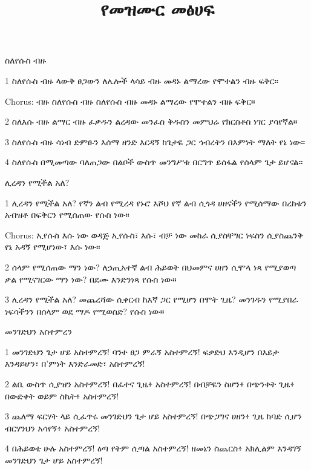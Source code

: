 \documentclass[12pt]{article}
\title{የመዝሙር መፅሀፍ}
\author{}
\date{}
\begin{document}
\maketitle
\newpage

\begin{hymn}{1}{ስለየሱስ ብዙ}
\begin{stanza}
1 ስለየሱስ ብዙ ላውቅ
ፀጋውን ለሌሎች ላሳይ
ብዙ መዳኑ ልማረው
የሞተልን ብዙ ፍቅር።
\end{stanza}
\begin{chorus}
Chorus: ብዙ ስለየሱስ
ብዙ ስለየሱስ
ብዙ መዳኑ ልማረው
የሞተልን ብዙ ፍቅር።
\end{chorus}
\begin{stanza}
2 ስለእሱ ብዙ ልማር
ብዙ ፈቃዱን ልረዳው
መንፈስ ቅዱስን መምህሬ
የክርስቶስ ነገር ያሳየኛል።
\end{stanza}
\begin{stanza}
3 ስለየሱስ ብዙ ሳነብ
ድምፁን እሰማ ዘንድ እርዳኝ
ከጌታዬ ጋር ኅብረትን
በእምነት ማለት የኔ ነው።
\end{stanza}
\begin{stanza}
4 ስለየሱስ በሚመጣው
ባለጠጋው በልቦች ውስጥ
መንግሥቱ በርግጥ ይሰፋል
የሰላም ጌታ ይሆናል።
\end{stanza}
\end{hymn}

\begin{hymn}{2}{ሊረዳን የሚችል አለ?}
\begin{stanza}
1 ሊረዳን የሚችል አለ?
የኛን ልብ የሚረዳ
የኑሮ እሾህ
የኛ ልብ ሲጎዳ
ሀዘናችን የሚሰማው
በረከቱን አብዝቶ
በፍቅርን የሚሰጠው
የሱስ ነው።
\end{stanza}
\begin{chorus}
Chorus: ኢየሱስ እሱ ነው
ወዳጅ ኢየሱስ፣ እሱ፣ ብቻ ነው
መከራ ሲያስቸግር
ነፍስን ሲያስጨንቅ
የኔ አዳኝ የሚሆነው፣ እሱ ነው።
\end{chorus}
\begin{stanza}
2 ሰላም የሚሰጠው ማን ነው?
ለኃጢአተኛ ልብ
ሕይወት በህመምና 
ሀዘን ሲሞላ
ነጻ የሚያወጣ ቃል
የሚናገርው ማን ነው?
በደሙ እንድንነጻ
የሱስ ነው።
\end{stanza}
\begin{stanza}
3 ሊረዳን የሚችል አለ?
መጨረሻው ሲቀርብ
ከእኛ ጋር የሚሆን
በሞት ጊዜ?
መንገዱን የሚያበራ
ነፍሳችንን በሰላም
ወደ ማዶ የሚወስድ?
የሱስ ነው።
\end{stanza}
\end{hymn}

\begin{hymn}{3}{መንገድህን አስተምረን}
\begin{stanza}
1 መንገድህን ጌታ ሆይ
አስተምረኝ!
ባንተ ፀጋ ምራኝ
አስተምረኝ!
ፍቃድህ እንዲሆን
በእይታ እንዳይሆን፣
በ'ምነት እንድራመድ፣
አስተምረኝ!
\end{stanza}
\begin{stanza}
2 ልቤ ውስጥ ሲያዝን
አስተምረኝ!
በፈተና ጊዜ፥
አስተምረኝ!
በብቻዬን ስሆን፥
በጭንቀት ጊዜ፥
በውድቀት ወይም ስኬት፥
አስተምረኝ!
\end{stanza}
\begin{stanza}
3 ጨለማ ፍርሃት ላይ
ሲፈጥሩ
መንገድህን ጌታ ሆይ
አስተምረኝ!
በጭጋግና ሀዘን፥
ጊዜ ከባድ ሲሆን
ብርሃንህን አሳየኝ፥
አስተምረኝ!
\end{stanza}
\begin{stanza}
4 በሕይወቴ ሁሉ
አስተምረኝ!
ዕጣ የትም ሲጣል
አስተምረኝ!
ዘመኔን ስጨርስ፥
አክሊልም እንዳገኝ
መንገድህን ጌታ ሆይ
አስተምረኝ!
\end{stanza}
\end{hymn}
\end{document}
